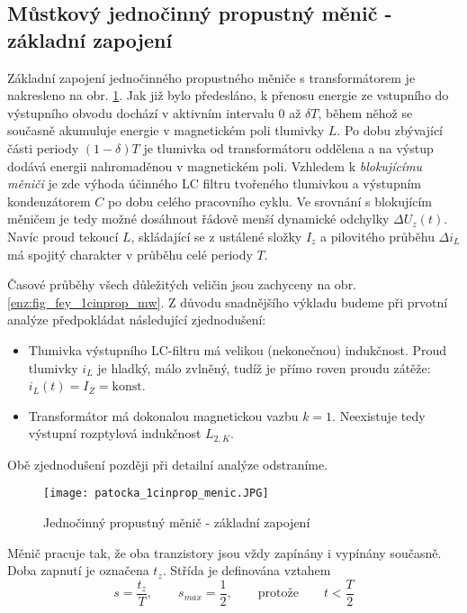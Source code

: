  \subsection{Můstkový jednočinný propustný měnič - základní zapojení}
    Základní zapojení jednočinného propustného měniče s transformátorem je nakresleno na obr. 
    \ref{enz:fig_fey_1cinprop_m}. Jak již bylo předesláno, k přenosu energie ze vstupního do 
    výstupního obvodu dochází v aktivním intervalu \(0\) až \(\delta T\), během něhož se současně 
    akumuluje energie v magnetickém poli tlumivky \(L\). Po dobu zbývající části periody 
    $(1-\delta)T$ je tlumivka od transformátoru oddělena a na výstup dodává energii nahromaděnou  
    v magnetickém poli. Vzhledem k \emph{blokujícímu měniči} je zde výhoda účinného LC filtru 
    tvořeného tlumivkou a výstupním kondenzátorem \(C\) po dobu celého pracovního cyklu. Ve 
    srovnání s blokujícím měničem je tedy možné dosáhnout řádově menší dynamické odchylky 
    \(\Delta U_z(t)\). Navíc proud tekoucí \(L\), skládající se z ustálené složky $I_z$ a 
    pilovitého průběhu $\Delta i_L$ má spojitý charakter v průběhu celé periody $T$. 
    
    Časové průběhy všech důležitých veličin jsou zachyceny na obr. \ref{enz:fig_fey_1cinprop_mw}. 
    Z důvodu snadnějšího výkladu budeme při prvotní analýze předpokládat následující zjednodušení:

    \begin{itemize}\addtolength{\itemsep}{-0.5\baselineskip}
      \item Tlumivka výstupního LC-filtru má velikou (nekonečnou) indukčnost. Proud tlumivky  
            \(i_L\) je hladký, málo zvlněný, tudíž je přímo roven proudu zátěže: \(i_L(t) = I_Z = 
            \text{konst}\).
      \item Transformátor má dokonalou magnetickou vazbu \(k=1\). Neexistuje tedy výstupní 
            rozptylová indukčnost \(L_{2,K}\).
    \end{itemize}
    Obě zjednodušení později při detailní analýze odstraníme.
    
    \begin{figure}[ht!]
      \texttt{[image: patocka\_1cinprop\_menic.JPG]}
      \caption{Jednočinný propustný měnič - základní zapojení}
      \label{enz:fig_fey_1cinprop_m}
    \end{figure}
  
    Měnič pracuje tak, že oba tranzistory jsou vždy zapínány i vypínány současně. Doba zapnutí je 
    označena \(t_z\). Střída je definována vztahem
    \begin{equation}\label{enz:eq_1cinpropm01}
      s = \frac{t_z}{T}, \qquad s_{max} = \frac{1}{2}, \qquad \text{protože} \qquad t<\frac{T}{2}
    \end{equation}     

